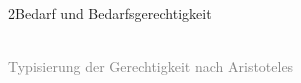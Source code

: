 \documentclass[xcolor=table,9pt,aspectratio=169]{beamer}
\begin{document}
\begin{frame}{\vspace*{10mm}2\hspace*{1em}Bedarf und Bedarfsgerechtigkeit}
\begin{center}
   \\
   \textcolor{gray}{Typisierung der Gerechtigkeit nach Aristoteles}
\end{center}
\end{frame}
\end{document}
